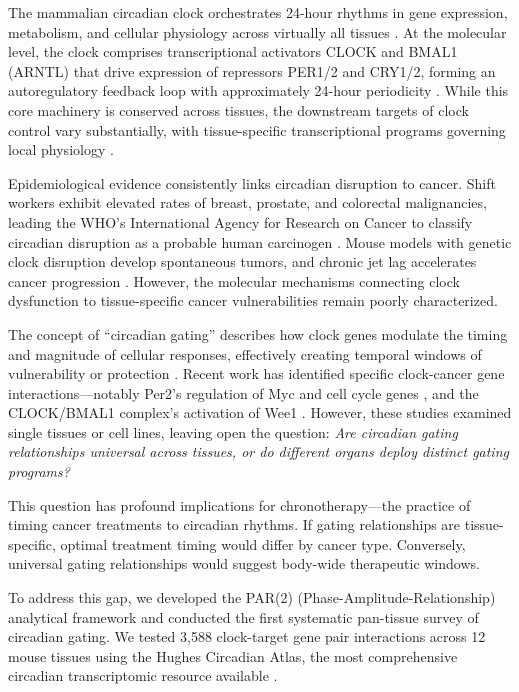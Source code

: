 \documentclass[11pt,letterpaper]{article}
\begin{document}
The mammalian circadian clock orchestrates 24-hour rhythms in gene expression, metabolism, and cellular physiology across virtually all tissues \citep{takahashi2017}. At the molecular level, the clock comprises transcriptional activators CLOCK and BMAL1 (ARNTL) that drive expression of repressors PER1/2 and CRY1/2, forming an autoregulatory feedback loop with approximately 24-hour periodicity \citep{reppert2002}. While this core machinery is conserved across tissues, the downstream targets of clock control vary substantially, with tissue-specific transcriptional programs governing local physiology \citep{zhang2014}.

Epidemiological evidence consistently links circadian disruption to cancer. Shift workers exhibit elevated rates of breast, prostate, and colorectal malignancies, leading the WHO's International Agency for Research on Cancer to classify circadian disruption as a probable human carcinogen \citep{straif2007}. Mouse models with genetic clock disruption develop spontaneous tumors, and chronic jet lag accelerates cancer progression \citep{fu2002}. However, the molecular mechanisms connecting clock dysfunction to tissue-specific cancer vulnerabilities remain poorly characterized.

The concept of ``circadian gating'' describes how clock genes modulate the timing and magnitude of cellular responses, effectively creating temporal windows of vulnerability or protection \citep{janich2021}. Recent work has identified specific clock-cancer gene interactions---notably Per2's regulation of Myc and cell cycle genes \citep{fu2002}, and the CLOCK/BMAL1 complex's activation of Wee1 \citep{matsuo2003}. However, these studies examined single tissues or cell lines, leaving open the question: \textit{Are circadian gating relationships universal across tissues, or do different organs deploy distinct gating programs?}

This question has profound implications for chronotherapy---the practice of timing cancer treatments to circadian rhythms. If gating relationships are tissue-specific, optimal treatment timing would differ by cancer type. Conversely, universal gating relationships would suggest body-wide therapeutic windows.

To address this gap, we developed the PAR(2) (Phase-Amplitude-Relationship) analytical framework and conducted the first systematic pan-tissue survey of circadian gating. We tested 3,588 clock-target gene pair interactions across 12 mouse tissues using the Hughes Circadian Atlas, the most comprehensive circadian transcriptomic resource available \citep{zhang2014}.
\end{document}
